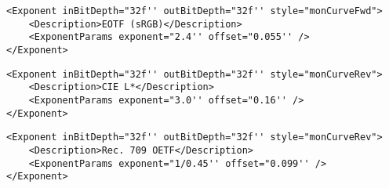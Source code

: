 \begin{lstlisting}[caption=Using \xml{Exponent} node for applying the intended EOTF found in IEC 61966-2-1:1999 (sRGB).]
<Exponent inBitDepth="32f'' outBitDepth="32f'' style="monCurveFwd">
	<Description>EOTF (sRGB)</Description>
	<ExponentParams exponent="2.4'' offset="0.055'' />
</Exponent>
\end{lstlisting}

\begin{lstlisting}[caption=Using \xml{Exponent} node to apply CIE L* formula.]
<Exponent inBitDepth="32f'' outBitDepth="32f'' style="monCurveRev">
	<Description>CIE L*</Description>
	<ExponentParams exponent="3.0'' offset="0.16'' />
</Exponent>
\end{lstlisting}

\begin{lstlisting}[caption=Using \xml{Exponent} node to apply Rec. 709 OETF.]
<Exponent inBitDepth="32f'' outBitDepth="32f'' style="monCurveRev">
	<Description>Rec. 709 OETF</Description>
	<ExponentParams exponent="1/0.45'' offset="0.099'' />
</Exponent>
\end{lstlisting}